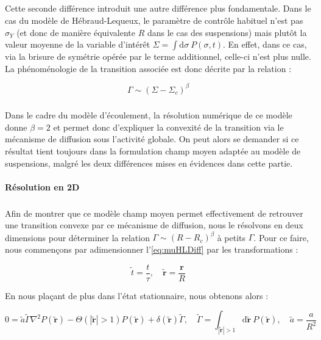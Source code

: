 \subparagraph{}Cette seconde différence introduit une autre différence plus fondamentale. Dans le cas du modèle de Hébraud-Lequeux, le paramètre de contrôle habituel n'est pas $\sigma_Y$ (et donc de manière équivalente $R$ dans le cas des suspensions) mais plutôt la valeur moyenne de la variable d'intérêt $\Sigma = \int \mathrm{d}\sigma~P(\sigma,t)$. En effet, dans ce cas, via la brisure de symétrie opérée par le terme additionnel, celle-ci n'est plus nulle. La phénoménologie de la transition associée est donc décrite par la relation :

\begin{equation}
	\Gamma \sim (\Sigma - \Sigma_c)^\beta
	\label{eq:paramordre_HL}
\end{equation}

\subparagraph{}Dans le cadre du modèle d'écoulement, la résolution numérique de ce modèle donne $\beta=2$ et permet donc d'expliquer la convexité de la transition via le mécanisme de diffusion sous l'activité globale. On peut alors se demander si ce résultat tient toujours dans la formulation champ moyen adaptée au modèle de suspensions, malgré les deux différences mises en évidences dans cette partie.

\paragraph{Résolution en 2D}

\subparagraph{}Afin de montrer que ce modèle champ moyen permet effectivement de retrouver une transition convexe par ce mécanisme de diffusion, nous le résolvons en deux dimensions pour déterminer la relation $\Gamma \sim (R - R_c)^\beta$ à petits $\Gamma$. Pour ce faire, nous commençons par adimensionner l'\autoref{eq:muHLDiff} par les transformations :

\begin{equation}
	\tilde{t} = \frac{t}{\tau}, \quad \tilde{\mathbf{r}} = \frac{\mathbf{r}}{R}
\end{equation}

\noindent En nous plaçant de plus dans l'état stationnaire, nous obtenons alors :

\begin{equation}
    0 = \tilde{a}\tilde{\Gamma}\nabla^2 P(\tilde{\mathbf{r}}) - \Theta(|\tilde{\mathbf{r}}|>1)P(\tilde{\mathbf{r}}) + \delta(\tilde{\mathbf{r}})\tilde{\Gamma}, \quad \tilde{\Gamma} = \int_{|\tilde{\mathbf{r}}|>1}\mathrm{d}\tilde{\mathbf{r}}~P(\tilde{\mathbf{r}}),\quad \tilde{a} = \frac{a}{R^2}
\end{equation} 

